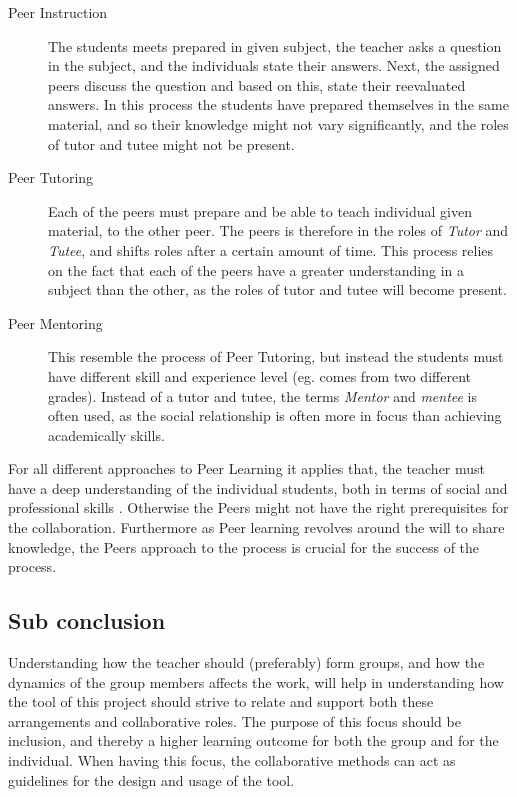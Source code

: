 \begin{description}
	\item[Peer Instruction] The students meets prepared in given subject, the teacher asks a question in the subject, and the individuals state their answers. Next, the assigned peers discuss the question and based on this, state their reevaluated answers. In this process the students have prepared themselves in the same material, and so their knowledge might not vary significantly, and the roles of tutor and tutee might not be present.  
	
	\item[Peer Tutoring] Each of the peers must prepare and be able to teach individual given material, to the other peer. The peers is therefore in the roles of \textit{Tutor} and \textit{Tutee}, and shifts roles after a certain amount of time. This process relies on the fact that each of the peers have a greater understanding in a subject than the other, as the roles of tutor and tutee will become present.     

	\item[Peer Mentoring] This resemble the process of Peer Tutoring, but instead the students must have different skill and experience level (eg. comes from two different grades). Instead of a tutor and tutee, the terms \textit{Mentor} and \textit{mentee} is often used, as the social relationship is often more in focus than achieving academically skills.      
\end{description}   

For all different approaches to Peer Learning it applies that, the teacher must have a deep understanding of the individual students, both in terms of social and professional skills \cite{collaborationCompetition}. Otherwise the Peers might not have the right prerequisites for the collaboration.
Furthermore as Peer learning revolves around the will to share knowledge, the Peers approach to the process is crucial for the success of the process\cite{collaborationCompetition}.


\subsection{Sub conclusion} %
Understanding how the teacher should (preferably) form groups, and how the dynamics of the group members affects the work, will help in understanding how the tool of this project should strive to relate and support both these arrangements and collaborative roles. The purpose of this focus should be inclusion, and thereby a higher learning outcome for both the group and for the individual. 
When having this focus, the collaborative methods can act as guidelines for the design and usage of the tool.\\

